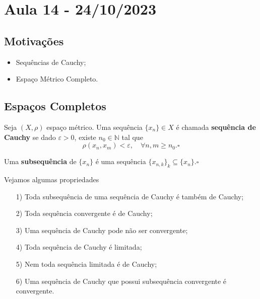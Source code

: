 \documentclass[MetricSpaces/metric_notes.tex]{subfiles}
\begin{document}
\section{Aula 14 - 24/10/2023}
\subsection{Motivações}
\begin{itemize}
	\item Sequências de Cauchy;
	\item Espaço Métrico Completo.
\end{itemize}
\subsection{Espaços Completos}
\begin{def*}
	Seja \((X, \rho )\) espaço métrico. Uma sequência \(\{x_{n}\}\in X\) é chamada \textbf{sequência de Cauchy }se dado \(\varepsilon > 0\), existe \(n_{0}\in \mathbb{N}\) tal que
	\[
		\rho (x_{n}, x_{m}) < \varepsilon ,\quad \forall n, m\geq n_{0}.\square
	\]
\end{def*}
\begin{def*}
	Uma \textbf{subsequência} de \(\{x_{n}\}\) é uma sequência \(\{x_{n, k}\}_{k}\subseteq{\{x_{n}\}}.\square\)
\end{def*}
Vejamos algumas propriedades
\begin{lemma*}
	\begin{itemize}
		\item[1)] Toda subsequência de uma sequência de Cauchy é também de Cauchy;
		\item[2)] Toda sequência convergente é de Cauchy;
		\item[3)] Uma sequência de Cauchy pode não ser convergente;
		\item[4)] Toda sequência de Cauchy é limitada;
		\item[5)] Nem toda sequência limitada é de Cauchy;
		\item[6)] Uma sequência de Cauchy que possui subsequência convergente é convergente.
	\end{itemize}
\end{lemma*}
\end{document}
